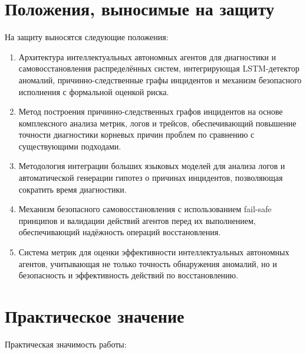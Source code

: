 \section*{Положения, выносимые на защиту}

На защиту выносятся следующие положения:

\begin{enumerate}
    \item Архитектура интеллектуальных автономных агентов для диагностики и самовосстановления распределённых систем, интегрирующая LSTM-детектор аномалий, причинно-следственные графы инцидентов и механизм безопасного исполнения с формальной оценкой риска.

    \item Метод построения причинно-следственных графов инцидентов на основе комплексного анализа метрик, логов и трейсов, обеспечивающий повышение точности диагностики корневых причин проблем по сравнению с существующими подходами.

    \item Методология интеграции больших языковых моделей для анализа логов и автоматической генерации гипотез о причинах инцидентов, позволяющая сократить время диагностики.

    \item Механизм безопасного самовосстановления с использованием fail-safe принципов и валидации действий агентов перед их выполнением, обеспечивающий надёжность операций восстановления.

    \item Система метрик для оценки эффективности интеллектуальных автономных агентов, учитывающая не только точность обнаружения аномалий, но и безопасность и эффективность действий по восстановлению.
\end{enumerate}

\section*{Практическое значение}

Практическая значимость работы:

